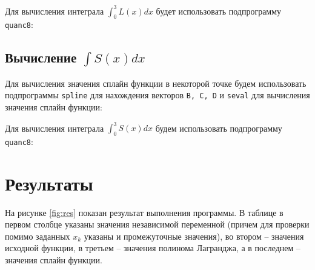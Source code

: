 
\parindent=1cm

Для вычисления интеграла $\int_0^3 L(x)dx$ будет использовать подпрограмму \texttt{quanc8}:


\parindent=1cm


\parindent=1cm

\subsection{Вычисление $\int S(x)dx$}

Для вычисления значения сплайн функции в некоторой точке будем использовать подпрограммы \texttt{spline} для нахождения векторов \texttt{B, C, D} и \texttt{seval} для вычисления значения сплайн функции:


\parindent=1cm

Для вычисления интеграла $\int_0^3 S(x)dx$ будем использовать подпрограмму \texttt{quanc8}:


\parindent=1cm


\parindent=1cm

\section{Результаты}

На рисунке \ref{fig:res} показан результат выполнения программы. В таблице в первом столбце указаны значения независимой переменной (причем для проверки помимо заданных $x_k$ указаны и промежуточные значения), во втором -- значения исходной функции, в третьем -- значения полинома Лагранджа, а в последнем -- значения сплайн функции.

